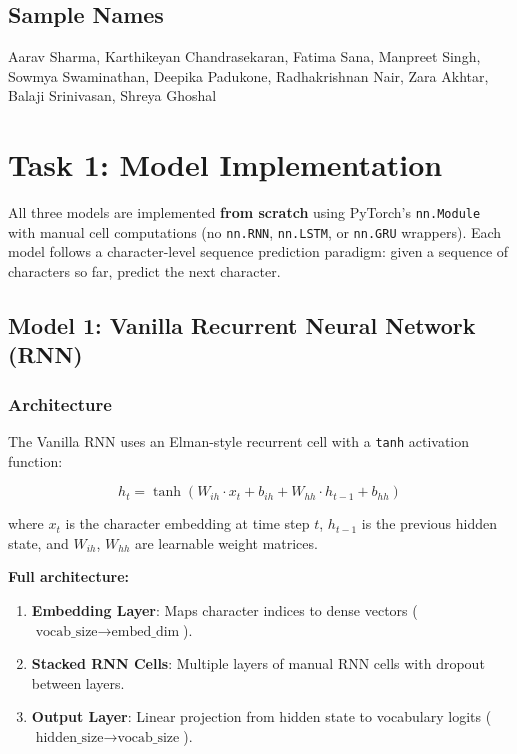 \documentclass[11pt,a4paper]{article}
\begin{document}
\subsection{Sample Names}
\begin{notebox}
Aarav Sharma, Karthikeyan Chandrasekaran, Fatima Sana, Manpreet Singh, Sowmya Swaminathan, Deepika Padukone, Radhakrishnan Nair, Zara Akhtar, Balaji Srinivasan, Shreya Ghoshal
\end{notebox}

\section{Task 1: Model Implementation}

All three models are implemented \textbf{from scratch} using PyTorch's \texttt{nn.Module} with manual cell computations (no \texttt{nn.RNN}, \texttt{nn.LSTM}, or \texttt{nn.GRU} wrappers). Each model follows a character-level sequence prediction paradigm: given a sequence of characters so far, predict the next character.

\subsection{Model 1: Vanilla Recurrent Neural Network (RNN)}

\subsubsection{Architecture}

The Vanilla RNN uses an Elman-style recurrent cell with a \texttt{tanh} activation function:

\begin{equation}
h_t = \tanh(W_{ih} \cdot x_t + b_{ih} + W_{hh} \cdot h_{t-1} + b_{hh})
\end{equation}

where $x_t$ is the character embedding at time step $t$, $h_{t-1}$ is the previous hidden state, and $W_{ih}$, $W_{hh}$ are learnable weight matrices.

\textbf{Full architecture:}
\begin{enumerate}[noitemsep]
    \item \textbf{Embedding Layer}: Maps character indices to dense vectors ($\text{vocab\_size} \to \text{embed\_dim}$).
    \item \textbf{Stacked RNN Cells}: Multiple layers of manual RNN cells with dropout between layers.
    \item \textbf{Output Layer}: Linear projection from hidden state to vocabulary logits ($\text{hidden\_size} \to \text{vocab\_size}$).
\end{enumerate}
\end{document}
